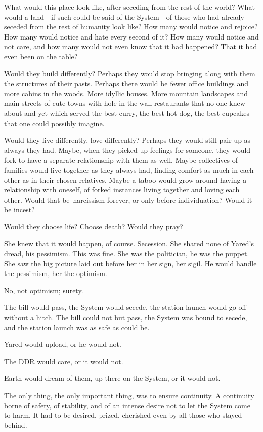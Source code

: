 What would this place look like, after seceding from the rest of the world? What would a land---if such could be said of the System---of those who had already seceded from the rest of humanity look like? How many would notice and rejoice? How many would notice and hate every second of it? How many would notice and not care, and how many would not even know that it had happened? That it had even been on the table?

Would they build differently? Perhaps they would stop bringing along with them the structures of their pasts. Perhaps there would be fewer office buildings and more cabins in the woods. More idyllic houses. More mountain landscapes and main streets of cute towns with hole-in-the-wall restaurants that no one knew about and yet which served the best curry, the best hot dog, the best cupcakes that one could possibly imagine.

Would they live differently, love differently? Perhaps they would still pair up as always they had. Maybe, when they picked up feelings for someone, they would fork to have a separate relationship with them as well. Maybe collectives of families would live together as they always had, finding comfort as much in each other as in their chosen relatives. Maybe a taboo would grow around having a relationship with oneself, of forked instances living together and loving each other. Would that be\pagebreak\ narcissism forever, or only before individuation? Would it be incest?

Would they choose life? Choose death? Would they pray?

She knew that it would happen, of course. Secession. She shared none of Yared's dread, his pessimism. This was fine. She was the politician, he was the puppet. She saw the big picture laid out before her in her sign, her sigil. He would handle the pessimism, her the optimism.

No, not optimism; surety.

The bill would pass, the System would secede, the station launch would go off without a hitch. The bill could not but pass, the System was bound to secede, and the station launch was as safe as could be.

Yared would upload, or he would not.

The DDR would care, or it would not.

Earth would dream of them, up there on the System, or it would not.

The only thing, the only important thing, was to ensure continuity. A continuity borne of safety, of stability, and of an intense desire not to let the System come to harm. It had to be desired, prized, cherished even by all those who stayed behind.

